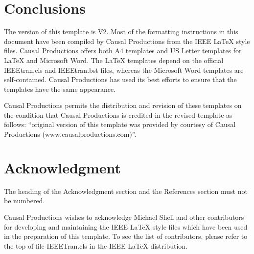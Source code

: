\documentclass[10pt,conference,a4paper]{IEEEtran}
\begin{document}
\section{Conclusions}

The version of this template is V2.  Most of the formatting
instructions in this document have been compiled by Causal Productions
from the IEEE LaTeX style files.  Causal Productions offers both A4
templates and US Letter templates for LaTeX and Microsoft Word.  The
LaTeX templates depend on the official IEEEtran.cls and IEEEtran.bst
files, whereas the Microsoft Word templates are self-contained.
Causal Productions has used its best efforts to ensure that the
templates have the same appearance.

\vfill

\pagebreak

Causal Productions permits the distribution and revision of these
templates on the condition that Causal Productions is credited in the
revised template as follows: ``original version of this template was
provided by courtesy of Causal Productions
(www.causalproductions.com)''.

\section*{Acknowledgment}

The heading of the Acknowledgment section and the References section
must not be numbered.

Causal Productions wishes to acknowledge Michael Shell and other
contributors for developing and maintaining the IEEE LaTeX style files
which have been used in the preparation of this template.  To see the
list of contributors, please refer to the top of file IEEETran.cls in
the IEEE LaTeX distribution.




\end{document}
